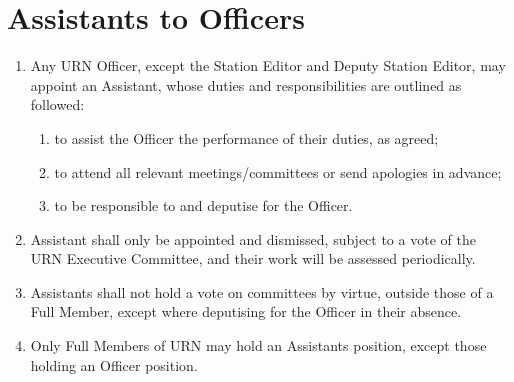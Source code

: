 \section{\label{scn:assistants} Assistants to Officers}

\begin{enumerate}[label*=\thesection.\arabic*.]
    \item Any URN Officer, except the Station Editor and Deputy Station Editor, may appoint an Assistant, whose duties and responsibilities are outlined as followed:
          \begin{enumerate}[label*=\arabic*.]
              \item to assist the Officer the performance of their duties, as agreed;
              \item to attend all relevant meetings/committees or send apologies in advance;
              \item to be responsible to and deputise for the Officer.
          \end{enumerate}
    \item Assistant shall only be appointed and dismissed, subject to a vote of the URN Executive Committee, and their work will be assessed periodically.
    \item Assistants shall not hold a vote on committees by virtue, outside those of a Full Member, except where deputising for the Officer in their absence.
    \item Only Full Members of URN may hold an Assistants position, except those holding an Officer position.
\end{enumerate}
